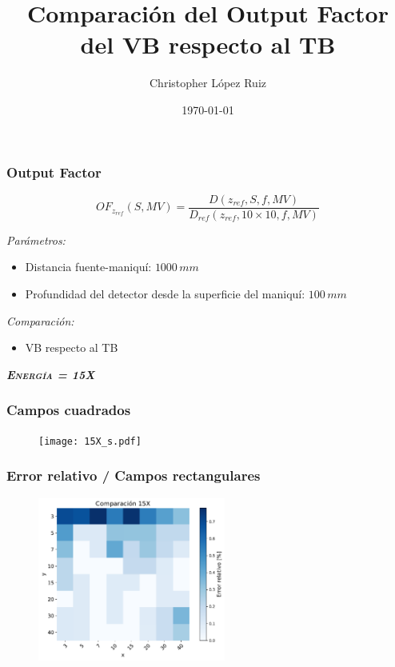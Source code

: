 \documentclass[aspectratio=169,xcolor=dvipsnames,t]{beamer}
\title{Comparación del Output Factor del VB respecto al TB}
\date{\today}
\author{Christopher López Ruiz}
\institute{INCan}
\newcommand{\be}{\begin{equation*}}
\newcommand{\ee}{\end{equation*}}
\begin{document}
\frame[plain,bg=fondo.jpg]{\titlepage}


\begin{frame}
    \frametitle{Output Factor}

    \be
      OF_{z_{ref}}(S,MV) = \frac{D(z_{ref},S,f,MV)}{D_{ref}(z_{ref},10 \times 10,f,MV)}
    \ee

    \vspace{10pt}

    \textit{Parámetros:}

    \begin{itemize}
      \item Distancia fuente-maniquí: $1000 \, mm$
      \item Profundidad del detector desde la superficie del maniquí: $100 \, mm$
    \end{itemize}

    \textit{Comparación:}
    \begin{itemize}
      \item VB respecto al TB
    \end{itemize}


\end{frame}


\begin{frame}[standout]
      \centering\LARGE
      \textbf{\itshape\scshape Energía = 15X}
\end{frame}

\begin{frame}
      \frametitle{Campos cuadrados}

      \begin{figure}
            \centering
            \texttt{[image: 15X\_s.pdf]}
      \end{figure}

\end{frame}

\begin{frame}
      \frametitle{Error relativo / Campos rectangulares}

      \begin{figure}
            \centering
            \includegraphics[width=0.55\textwidth]{15X_hm1.pdf}
      \end{figure}

\end{frame}
\end{document}
